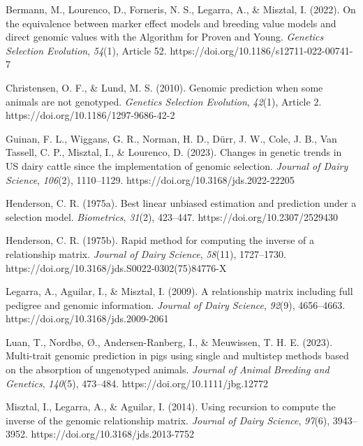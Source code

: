 \documentclass[authordate, empirical]{jote-new-article}
\begin{document}
	Bermann, M., Lourenco, D., Forneris, N. S., Legarra, A., \& Misztal, I. (2022). On the equivalence between marker effect models and breeding value models and direct genomic values with the Algorithm for Proven and Young. \emph{Genetics Selection Evolution}, \emph{54}(1), Article 52. https://doi.org/10.1186/s12711-022-00741-7



	Christensen, O. F., \& Lund, M. S. (2010). Genomic prediction when some animals are not genotyped. \emph{Genetics Selection Evolution}, \emph{42}(1), Article 2. https://doi.org/10.1186/1297-9686-42-2



	Guinan, F. L., Wiggans, G. R., Norman, H. D., Dürr, J. W., Cole, J. B., Van Tassell, C. P., Misztal, I., \& Lourenco, D. (2023). Changes in genetic trends in US dairy cattle since the implementation of genomic selection. \emph{Journal of Dairy Science}, \emph{106}(2), 1110--1129. https://doi.org/10.3168/jds.2022-22205



	Henderson, C. R. (1975a). Best linear unbiased estimation and prediction under a selection model. \emph{Biometrics}, \emph{31}(2), 423--447. https://doi.org/10.2307/2529430



	Henderson, C. R. (1975b). Rapid method for computing the inverse of a relationship matrix. \emph{Journal of Dairy Science}, \emph{58}(11), 1727--1730. https://doi.org/10.3168/jds.S0022-0302(75)84776-X



	Legarra, A., Aguilar, I., \& Misztal, I. (2009). A relationship matrix including full pedigree and genomic information. \emph{Journal of Dairy Science}, \emph{92}(9), 4656--4663. https://doi.org/10.3168/jds.2009-2061



	Luan, T., Nordbø, Ø., Andersen-Ranberg, I., \& Meuwissen, T. H. E. (2023). Multi-trait genomic prediction in pigs using single and multistep methods based on the absorption of ungenotyped animals. \emph{Journal of Animal Breeding and Genetics}, \emph{140}(5), 473--484. https://doi.org/10.1111/jbg.12772



	Misztal, I., Legarra, A., \& Aguilar, I. (2014). Using recursion to compute the inverse of the genomic relationship matrix. \emph{Journal of Dairy Science}, \emph{97}(6), 3943--3952. https://doi.org/10.3168/jds.2013-7752
\end{document}
